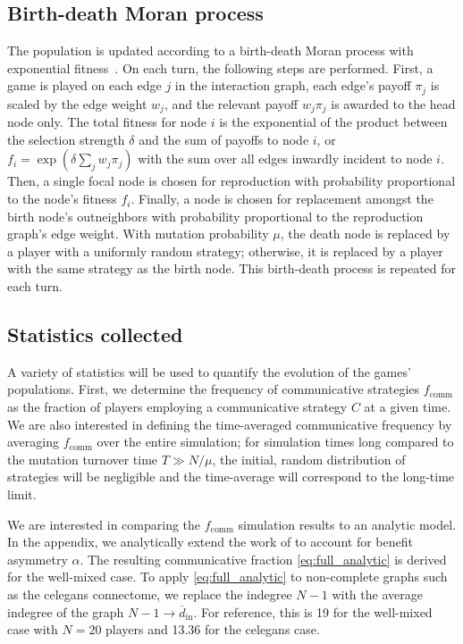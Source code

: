 \documentclass[pdflatex,lineno,referee,sn-mathphys-ay]{sn-jnl}
\begin{document}
\subsection{Birth-death Moran process}
\label{sec:evo_setup}
The population is updated according to a birth-death Moran process
with exponential fitness~\citep[\eg \cf][]{lieberman2005evolutionary}.
On each turn, the following steps are performed.
First, a game is played on each edge $j$ in the interaction graph,
each edge's payoff $\pi_j$ is scaled by the edge weight $w_j$,
and the relevant payoff $w_j \pi_j$ is awarded to the head node only.
The total fitness for node $i$ is the exponential of the product
between the selection strength $\delta$
and the sum of payoffs to node $i$,
or $f_i = \exp(\delta \sum_j w_j \pi_j)$ with the sum
over all edges inwardly incident to node $i$.
Then, a single focal node is chosen for reproduction
with probability proportional to the node's fitness $f_i$.
Finally, a node is chosen for replacement amongst the birth node's outneighbors
with probability proportional to the reproduction graph's edge weight.
With mutation probability $\mu$,
the death node is replaced by a player with a uniformly random strategy;
otherwise, it is replaced by a player with the same strategy as the birth node.
This birth-death process is repeated for each turn.

\subsection{Statistics collected}
\label{sec:stats_setup}
A variety of statistics will be used to quantify the evolution
of the games' populations.
First, we determine the frequency of communicative strategies
$f_{\text{comm}}$ as the fraction of players employing
a communicative strategy $C$ at a given time.
We are also interested in defining the time-averaged communicative frequency
by averaging $f_{\text{comm}}$ over the entire simulation;
for simulation times long compared to the mutation turnover time $T \gg N/\mu$,
the initial, random distribution of strategies will be negligible
and the time-average will correspond to the long-time limit.

We are interested in comparing the $f_{\text{comm}}$ simulation results
to an analytic model.
In the appendix, we analytically extend the work of \citet{tripp2022evolutionary}
to account for benefit asymmetry $\alpha$.
The resulting communicative fraction \cref{eq:full_analytic}
is derived for the well-mixed case.
To apply \cref{eq:full_analytic} to non-complete graphs such as
the \gls{celegans} connectome,
we replace the indegree $N-1$ with the average indegree of the graph
$N-1 \to \overline{d}_{\text{in}}$.
For reference, this is \num{19} for the well-mixed case with $N=20$ players
and \num{13.36} for the \gls{celegans} case.
\end{document}
